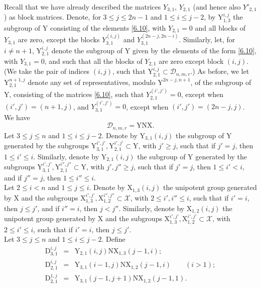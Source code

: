 \documentclass[12pts]{amsart}
\begin{document}
Recall that we have already described the matrices $Y_{3,1}$, $Y_{2,1}$
(and hence also $Y'_{2,1}$) as block matrices. Denote, for $3\leq
j\leq 2n-1$ and $1\leq i\leq j-2$, by $\mathrm{Y}_{1,3}^{i,j}$ the
subgroup of $\mathrm{Y}$ consisting of the elements \eqref{6.10},
with $Y_{2,1}=0$ and all blocks of $Y_{3,1}$ are zero, except the
blocks $Y_{3,1}^{(i,j)}$ and $Y_{3,1}^{(2n-j,2n-i)}$. Similarly, let, for $i\neq n+1$,
$\mathrm{Y}_{2,1}^{i,j}$ denote the subgroup of $\mathrm{Y}$ given by
the elements of the form \eqref{6.10}, with $Y_{3,1}=0$, and such
that all the blocks of $Y_{2,1}$ are zero except block $(i,j)$. (We take the pair of indices $(i,j)$, such that
$\mathrm{Y}_{2,1}^{i,j}\subset \mathcal{D}_{n,m,r}$.) As before, we let
$\mathrm{Y}_{2,1}^{n+1,j}$ denote any set of representatives, modulo $\mathrm{Y}^{2n-j,n+1}$,
of the subgroup of $\mathrm{Y}$, consisting of the matrices \eqref{6.10}, such that $Y_{2,1}^{(i',j')}=0$, except when $(i',j')=(n+1,j)$,
and $Y_{3,1}^{(i',j')}=0$, except when $(i',j')=(2n-j,j)$.\\
We have
\begin{equation}\label{6.11}
\mathcal{D}_{n,m,r}=\mathrm{Y}\mathrm{N}\mathrm{X}.
\end{equation}
Let $3\leq j\leq n$ and $1\leq i\leq j-2$. Denote by
$\mathrm{Y}_{3,1}(i,j)$ the subgroup of $\mathrm{Y}$ generated by
the subgroups
$\mathrm{Y}_{3,1}^{i',j'},\mathrm{Y}_{2,1}^{i',j'}\subset
\mathrm{Y}$, with $j'\geq j$, such that if $j'=j$, then $1\leq
i'\leq i$. Similarly, denote by $\mathrm{Y}_{2,1}(i,j)$ the subgroup
of $\mathrm{Y}$ generated by the subgroups
$\mathrm{Y}_{3,1}^{i',j'}, \mathrm{Y}_{2,1}^{i'',j''}\subset
\mathrm{Y}$, with $j', j''\geq j$, such that if $j'=j$, then $1\leq
i'<i$, and
if $j''=j$, then $1\leq i''\leq i$.\\
Let $2\leq i< n$ and $1\leq j\leq i$. Denote by
$\mathrm{X}_{1,3}(i,j)$ the unipotent group generated by
$\mathrm{X}$ and the subgroups $\mathrm{X}_{1,3}^{i',j'},
\mathrm{X}_{1,2}^{i'',j''}\subset \mathcal{X}$, with $2\leq
i',i''\leq i$, such that if $i'=i$, then $j\leq j'$, and if $i''=i$,
then $j<j''$. Similarly, denote by $\mathrm{X}_{1,2}(i,j)$ the
unipotent group generated by $\mathrm{X}$ and the subgroups
$\mathrm{X}_{1,3}^{i',j'}, \mathrm{X}_{1,2}^{i',j'}\subset
\mathcal{X}$, with $2\leq i'\leq i$, such that if $i'=i$, then
$j\leq j'$.\\
Let $3\leq j\leq n$ and $1\leq i\leq j-2$. Define
\begin{equation}\label{6.12}
\begin{array}{rcl}
\mathrm{D}_{3,1}^{i,j}&=&\mathrm{Y}_{2,1}(i,j)\mathrm{N}\mathrm{X}_{1,3}(j-1,i);\\
\mathrm{D}_{2,1}^{i,j}&=&\mathrm{Y}_{3,1}(i-1,j)\mathrm{N}\mathrm{X}_{1,2}(j-1,i)\qquad
(i>1);\\
\mathrm{D}_{2,1}^{1,j}&=&\mathrm{Y}_{3,1}(j-1,j+1)\mathrm{N}\mathrm{X}_{1,2}(j-1,1).
\end{array}
\end{equation}
\end{document}

